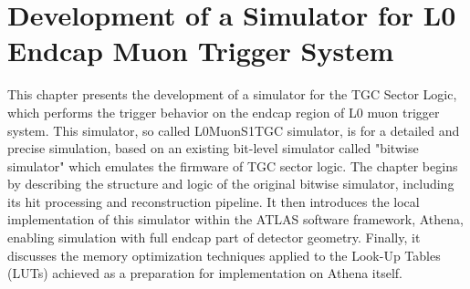 \chapter{Development of a Simulator for L0 Endcap Muon Trigger System} \label{ch:L0MuonS1TGC}
This chapter presents the development of a simulator for the TGC Sector Logic, which performs the trigger behavior on the endcap region of L0 muon trigger system. This simulator, so called L0MuonS1TGC simulator, is for a detailed and precise simulation, based on an existing bit-level simulator called "bitwise simulator" which emulates the firmware of TGC sector logic. The chapter begins by describing the structure and logic of the original bitwise simulator, including its hit processing and reconstruction pipeline. It then introduces the local implementation of this simulator within the ATLAS software framework, Athena, enabling simulation with full endcap part of detector geometry. Finally, it discusses the memory optimization techniques applied to the Look-Up Tables (LUTs) achieved as a preparation for implementation on Athena itself.
